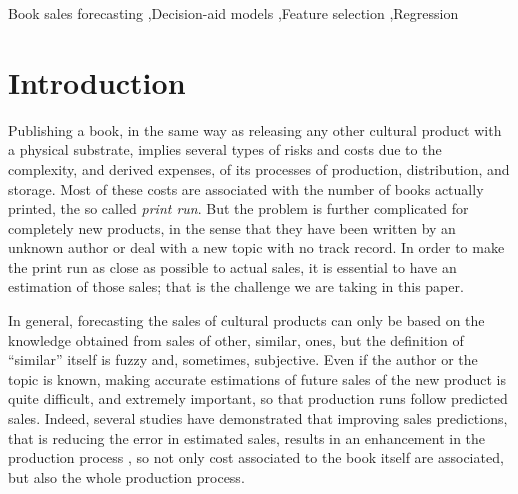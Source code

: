 \documentclass[a4paper,10pt,twocolumn,preprint,3p]{elsarticle}
\begin{document}
\begin{frontmatter}
\begin{keyword}
Book sales forecasting \sep Decision-aid models \sep Feature selection \sep Regression  
\end{keyword}

\end{frontmatter}



\section{Introduction}

Publishing a book, in the same way as releasing any other cultural product with a physical substrate, implies several types of risks and costs due to
the complexity, and derived expenses, of its processes of production,
distribution, and storage. Most of these costs are associated
with the number of books actually printed, the so called {\em print run}. But the problem is further
complicated for completely new products, in the sense that they have been written by an unknown
author or deal with a new topic with no track record. In order to make
the print run as close as possible to actual sales, it is essential to
have an estimation of those sales; that is the challenge we are taking
in this paper. 

In general, forecasting the sales of cultural products can
only be based on the knowledge obtained from sales of other, similar, ones,
but the definition of ``similar'' itself is fuzzy and, sometimes,
subjective. Even if the author or the topic is known, making accurate
estimations of future sales of the new product is quite difficult, and
extremely important, so that production runs follow predicted sales.  
Indeed, several studies have demonstrated that improving sales
predictions, that is reducing the error in estimated sales, results in an enhancement in the 
production process \cite{Fildes2010,Saeed2008}, so not only cost
associated to the book itself are associated, but also the whole
production process.
\end{document}
